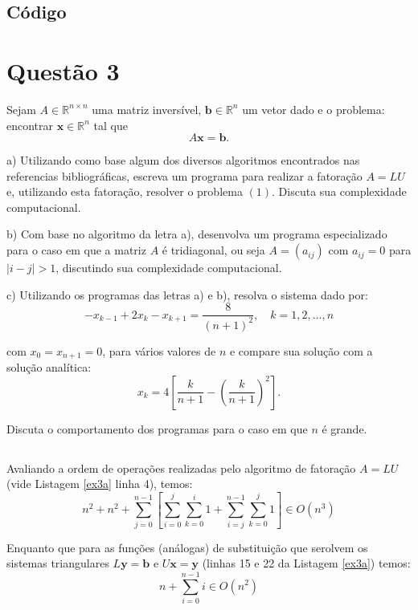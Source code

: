 \documentclass[12pt,a4paper,final]{article}
\begin{document}
\subsection*{Código}




\section{Questão 3}

Sejam $ A \in \mathbb{R}^{n×n} $ uma matriz inversível, $ \mathbf{b} \in \mathbb{R}^{n} $
um vetor dado e o problema: encontrar $ \mathbf{x} \in \mathbb{R}^{n} $ tal que
\begin{equation}
A\mathbf{x} = \mathbf{b}.
\end{equation}

a) Utilizando como base algum dos diversos algoritmos encontrados nas referencias
bibliográficas, escreva um programa para realizar a fatoração $ A = LU $ e, 
utilizando esta fatoração, resolver o problema $ (1). $
Discuta sua complexidade computacional.

b) Com base no algoritmo da letra a), desenvolva um programa especializado para o caso 
em que a matriz $ A $ é tridiagonal, ou seja $ A = (a_{ij}) $ com $ a_{ij} = 0 $ para 
$ |i − j| > 1 $, discutindo sua complexidade computacional.

c) Utilizando os programas das letras a) e b), resolva o sistema dado por:
\[ −x_{k−1} + 2x_k − x_{k+1} = \frac{8}{(n + 1)^2}, \quad k = 1, 2, . . . , n \]

com $ x_0 = x_{n+1} = 0 $, para vários valores de $ n $ e compare sua solução com a
solução analítica:
\[ x_k = 4 \left[ \frac{k}{n+1} - \left( \frac{k}{n+1} \right)^2 \right]. \]

Discuta o comportamento dos programas para o caso em que $ n $ é grande.

\subsection{}
Avaliando a ordem de operações realizadas pelo algoritmo de fatoração $ A=LU $ (vide 
Listagem \ref{ex3a} linha 4), temos:
\[ n^2 + n^2 + \sum_{j=0}^{n-1} \left[ 
   \sum_{i=0}^{j}\sum_{k=0}^{i}1 + \sum_{i=j}^{n-1}\sum_{k=0}^{j}1
   \right] \in O(n^3) \]

Enquanto que para as funções (análogas) de substituição que serolvem os sistemas
triangulares $ L\mathbf{y} = \mathbf{b} $ e $ U\mathbf{x} = \mathbf{y} $ (linhas 15 e 22 
da Listagem \ref{ex3a}) temos:
\[ n + \sum_{i=0}^{n-1}i \in O(n^2) \]
\end{document}
